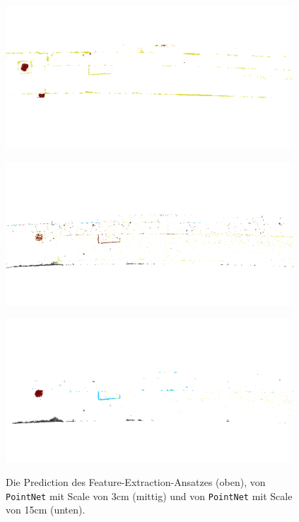 \begin{figure}
    {\includegraphics[width=0.96\textwidth]{graphics/eval_left_prediction}}
    \par\smallskip
    {\includegraphics[width=0.96\textwidth]{graphics/eval_poinnet_3_left}}
    \par\smallskip
    {\includegraphics[width=0.96\textwidth]{graphics/eval_poinnet_15_left}}
    \caption{Die Prediction des Feature-Extraction-Ansatzes (oben), von \texttt{PointNet} mit Scale von 3cm (mittig) und von \texttt{PointNet} mit Scale von 15cm (unten).}
    \label{fig:cmp_pointnet_left}
\end{figure}


